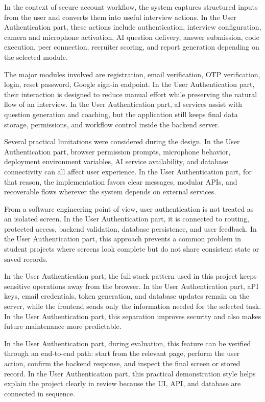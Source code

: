 \documentclass[12pt,a4paper]{report}
\begin{document}
In the context of secure account workflow, the system captures structured inputs from the user and converts them into useful interview actions. In the User Authentication part, these actions include authentication, interview configuration, camera and microphone activation, AI question delivery, answer submission, code execution, peer connection, recruiter scoring, and report generation depending on the selected module.


The major modules involved are registration, email verification, OTP verification, login, reset password, Google sign-in endpoint. In the User Authentication part, their interaction is designed to reduce manual effort while preserving the natural flow of an interview. In the User Authentication part, aI services assist with question generation and coaching, but the application still keeps final data storage, permissions, and workflow control inside the backend server.


Several practical limitations were considered during the design. In the User Authentication part, browser permission prompts, microphone behavior, deployment environment variables, AI service availability, and database connectivity can all affect user experience. In the User Authentication part, for that reason, the implementation favors clear messages, modular APIs, and recoverable flows wherever the system depends on external services.


From a software engineering point of view, user authentication is not treated as an isolated screen. In the User Authentication part, it is connected to routing, protected access, backend validation, database persistence, and user feedback. In the User Authentication part, this approach prevents a common problem in student projects where screens look complete but do not share consistent state or saved records.


In the User Authentication part, the full-stack pattern used in this project keeps sensitive operations away from the browser. In the User Authentication part, aPI keys, email credentials, token generation, and database updates remain on the server, while the frontend sends only the information needed for the selected task. In the User Authentication part, this separation improves security and also makes future maintenance more predictable.


In the User Authentication part, during evaluation, this feature can be verified through an end-to-end path: start from the relevant page, perform the user action, confirm the backend response, and inspect the final screen or stored record. In the User Authentication part, this practical demonstration style helps explain the project clearly in review because the UI, API, and database are connected in sequence.
\end{document}
